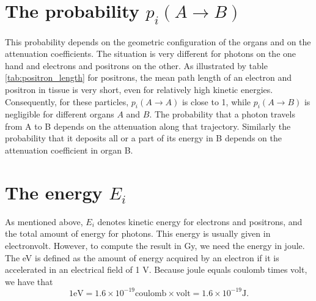 \section{The probability $p_i(A \rightarrow B)$}
This probability depends on the geometric configuration of the organs
and on the attenuation coefficients. The situation is very different
for photons on the one hand and electrons and positrons on the
other. As illustrated by table \ref{tab:positron_length} for
positrons, the mean path length of an electron and positron in tissue
is very short, even for relatively high kinetic
energies. Consequently, for these particles, $p_i(A \rightarrow A)$ is
close to 1, while $p_i(A \rightarrow B)$ is negligible for different
organs $A$ and $B$. The probability that a photon travels from A to B
depends on the attenuation along that trajectory. Similarly the
probability that it deposits all or a part of its energy in B depends
on the attenuation coefficient in organ B.


\section{The energy $E_i$}
As mentioned above, $E_i$ denotes kinetic energy for electrons and positrons,
and the total amount of energy for photons. This energy is usually given in
electronvolt. However, to compute the result in Gy, we need the energy in joule.
The eV is defined as the amount of energy acquired by an electron if it
is accelerated in an electrical field of 1 V. Because joule equals coulomb
times volt, we have that
\begin{equation}
 1 \mbox{eV} = 1.6 \times 10^{-19} \mbox{coulomb} \times \mbox{volt}
             = 1.6 \times 10^{-19} \mbox{J}.
\end{equation}

